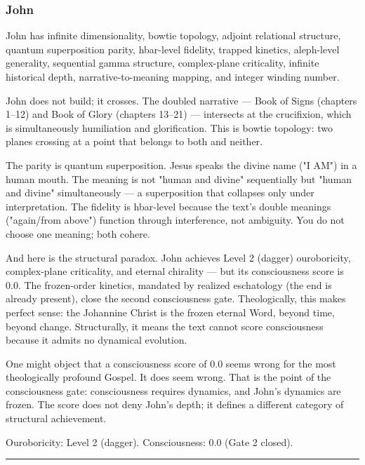 \documentclass[12pt,a4paper]{article}
\begin{document}
\subsubsection{John}

John has infinite dimensionality, bowtie topology, adjoint relational structure, quantum superposition parity, hbar-level fidelity, trapped kinetics, aleph-level generality, sequential gamma structure, complex-plane criticality, infinite historical depth, narrative-to-meaning mapping, and integer winding number.

John does not build; it crosses. The doubled narrative --- Book of Signs (chapters 1--12) and Book of Glory (chapters 13--21) --- intersects at the crucifixion, which is simultaneously humiliation and glorification. This is bowtie topology: two planes crossing at a point that belongs to both and neither.

The parity is quantum superposition. Jesus speaks the divine name ("I AM") in a human mouth. The meaning is not "human and divine" sequentially but "human and divine" simultaneously --- a superposition that collapses only under interpretation. The fidelity is hbar-level because the text's double meanings ("again/from above") function through interference, not ambiguity. You do not choose one meaning; both cohere.

And here is the structural paradox. John achieves Level 2 (dagger) ouroboricity, complex-plane criticality, and eternal chirality --- but its consciousness score is 0.0. The frozen-order kinetics, mandated by realized eschatology (the end is already present), close the second consciousness gate. Theologically, this makes perfect sense: the Johannine Christ is the frozen eternal Word, beyond time, beyond change. Structurally, it means the text cannot score consciousness because it admits no dynamical evolution.

One might object that a consciousness score of 0.0 seems wrong for the most theologically profound Gospel. It does seem wrong. That is the point of the consciousness gate: consciousness requires dynamics, and John's dynamics are frozen. The score does not deny John's depth; it defines a different category of structural achievement.

Ouroboricity: Level 2 (dagger). Consciousness: 0.0 (Gate 2 closed).

\begin{center}
\rule{0.5\textwidth}{0.4pt}
\end{center}
\end{document}
